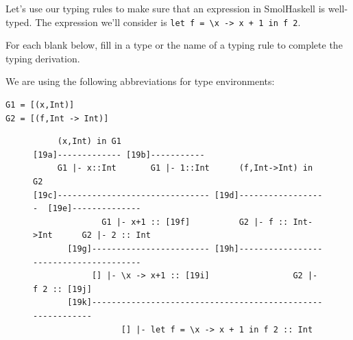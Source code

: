 \documentclass[addpoints]{exam}
\begin{document}
\begin{questions}
\newpage

Let's use our typing rules to make sure that an expression in SmolHaskell is well-typed.  The expression we'll consider is \verb|let f = \x -> x + 1 in f 2|.

For each blank below, fill in a type or the name of a typing rule to complete the typing derivation.

We are using the following abbreviations for type environments:
\begin{verbatim}
G1 = [(x,Int)]
G2 = [(f,Int -> Int)]
\end{verbatim}

\begin{figure}[h]
\advance\leftskip-20cm
{\small
\begin{verbatim}
     (x,Int) in G1                                
[19a]------------- [19b]-----------
     G1 |- x::Int       G1 |- 1::Int      (f,Int->Int) in G2
[19c]------------------------------- [19d]------------------  [19e]--------------
              G1 |- x+1 :: [19f]          G2 |- f :: Int->Int      G2 |- 2 :: Int
       [19g]------------------------ [19h]---------------------------------------
            [] |- \x -> x+1 :: [19i]                 G2 |- f 2 :: [19j]
       [19k]-----------------------------------------------------------
                  [] |- let f = \x -> x + 1 in f 2 :: Int
\end{verbatim}
}
\end{figure}

\end{questions}
\end{document}
